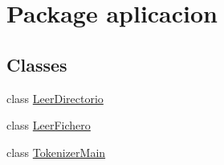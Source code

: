 \hypertarget{namespaceaplicacion}{}\section{Package aplicacion}
\label{namespaceaplicacion}
\subsection*{Classes}
\begin{DoxyCompactItemize}
\item 
class \hyperlink{classaplicacion_1_1_leer_directorio}{Leer\+Directorio}
\item 
class \hyperlink{classaplicacion_1_1_leer_fichero}{Leer\+Fichero}
\item 
class \hyperlink{classaplicacion_1_1_tokenizer_main}{Tokenizer\+Main}
\end{DoxyCompactItemize}
